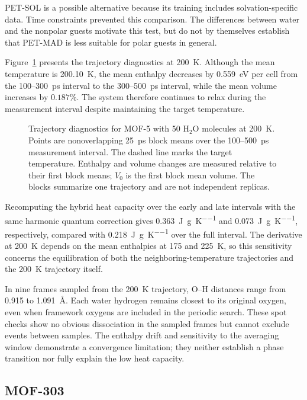 \documentclass[12pt,a4paper]{article}
\numberwithin{equation}{section}
\begin{document}
PET-SOL is a possible alternative because its training includes
solvation-specific data. Time constraints prevented this comparison.
The differences between water and the nonpolar guests motivate this test,
but do not by themselves establish that PET-MAD is less suitable for
polar guests in general.

Figure~\ref{fig:water-diagnostics-mof5} presents the trajectory diagnostics
at \SI{200}{K}. Although the mean temperature is \SI{200.10}{K},
the mean enthalpy decreases by \SI{0.559}{eV} per cell from the
100--\SI{300}{ps} interval to the 300--\SI{500}{ps} interval,
while the mean volume increases by $0.187\%$. The system therefore
continues to relax during the measurement interval despite maintaining
the target temperature.

\begin{figure}[htbp]
  \centering
  
  \caption{Trajectory diagnostics for MOF-5 with 50 H$_2$O molecules at
  \SI{200}{K}. Points are nonoverlapping \SI{25}{ps} block means over
  the 100--\SI{500}{ps} measurement interval. The dashed line marks the
  target temperature. Enthalpy and volume changes are measured relative
  to their first block means; $V_0$ is the first block mean volume.
  The blocks summarize one trajectory and are not independent replicas.}
  \label{fig:water-diagnostics-mof5}
\end{figure}

Recomputing the hybrid heat capacity over the early and late intervals
with the same harmonic quantum correction gives
\SI{0.363}{J\per g\per K} and \SI{0.073}{J\per g\per K}, respectively,
compared with \SI{0.218}{J\per g\per K} over the full interval.
The derivative at \SI{200}{K} depends on the mean enthalpies at 175 and
\SI{225}{K}, so this sensitivity concerns the equilibration of both
the neighboring-temperature trajectories and the \SI{200}{K} trajectory
itself.

In nine frames sampled from the \SI{200}{K} trajectory, O--H distances
range from 0.915 to \SI{1.091}{\angstrom}. Each water hydrogen remains
closest to its original oxygen, even when framework oxygens are included
in the periodic search. These spot checks show no obvious dissociation
in the sampled frames but cannot exclude events between samples.
The enthalpy drift and sensitivity to the averaging window demonstrate
a convergence limitation; they neither establish a phase transition
nor fully explain the low heat capacity.

\clearpage
\subsection{MOF-303}
\label{sec:mof303-results}
\end{document}
